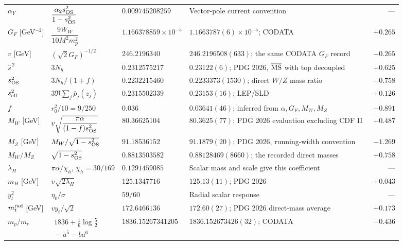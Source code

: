 \documentclass[aps,prx,reprint,longbibliography]{revtex4-2}
\begin{document}
\begin{longtable}{@{}L{.125\textwidth}L{.255\textwidth}L{.18\textwidth}L{.32\textwidth}r@{}}
$\alpha_Y$ & $\dfrac{\alpha_2s_{\rm OS}^2}{1-s_{\rm OS}^2}$ & $0.009745208259$ & Vector-pole current convention & ---\\
$G_F$ [GeV$^{-2}$] & $\dfrac{9W_W}{10M^2m_p^2}$ & $1.166378859\times10^{-5}$ & $1.1663787(6)\times10^{-5}$; CODATA~\cite{CODATA} & $+0.265$\\
$v$ [GeV] & $(\sqrt2G_F)^{-1/2}$ & $246.2196340$ & $246.2196508(633)$; the same CODATA $G_F$ record~\cite{CODATA} & $-0.265$\\
$\widehat s^{\,2}$ & $3N_h$ & $0.2312575217$ & $0.23122(6)$; PDG 2026, $\overline{\rm MS}$ with top decoupled~\cite{PDG} & $+0.625$\\
$s_{\rm OS}^2$ & $3N_h/(1+f)$ & $0.2232215460$ & $0.2233373(1530)$; direct $W/Z$ mass ratio~\cite{PDG} & $-0.758$\\
$s_{\rm eff}^2$ & $3\Re\sum_j\bar p_j(z_j)$ & $0.2315502339$ & $0.23153(16)$; LEP/SLD~\cite{LEPSLD} & $+0.126$\\
$f$ & $r_0^2/10=9/250$ & $0.036$ & $0.03641(46)$; inferred from $\alpha,G_F,M_W,M_Z$~\cite{CODATA,PDG} & $-0.891$\\
$M_W$ [GeV] & $v\sqrt{\dfrac{\pi\alpha}{(1-f)s_{\rm OS}^2}}$ & $80.36625104$ & $80.3625(77)$; PDG 2026 evaluation excluding CDF II~\cite{PDG} & $+0.487$\\
$M_Z$ [GeV] & $M_W/\sqrt{1-s_{\rm OS}^2}$ & $91.18536152$ & $91.1879(20)$; PDG 2026, running-width convention~\cite{PDG} & $-1.269$\\
$M_W/M_Z$ & $\sqrt{1-s_{\rm OS}^2}$ & $0.8813503582$ & $0.88128469(8660)$; the recorded direct masses~\cite{PDG} & $+0.758$\\
\pagebreak
$\lambda_H$ & $\pi\alpha/\chi_h$, $\chi_h=30/169$ & $0.1291459085$ & Scalar mass and scale give this coefficient & ---\\
$m_H$ [GeV] & $v\sqrt{2\lambda_H}$ & $125.1347716$ & $125.13(11)$; PDG 2026~\cite{PDG} & $+0.043$\\
$y_t^2$ & $\eta_0/\sigma$ & $59/60$ & Radial scalar response & ---\\
$m_t^{\rm rad}$ [GeV] & $vy_t/\sqrt2$ & $172.6466136$ & $172.60(27)$; PDG 2026 direct-mass average~\cite{PDG} & $+0.173$\\
$m_p/m_e$ & $\begin{aligned}1836+\tfrac16\log\tfrac52\\[-2pt]{}-a^5-ba^6\end{aligned}$ & $1836.15267341205$ & $1836.152673426(32)$; CODATA~\cite{CODATA} & $-0.436$\\

\end{longtable}
\end{document}
